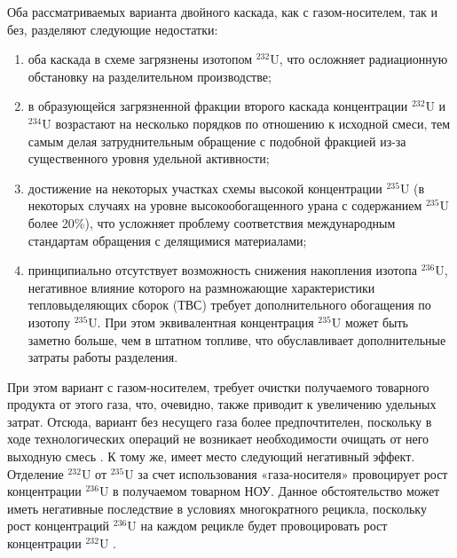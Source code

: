 Оба рассматриваемых варианта двойного каскада, как с газом-носителем, так и без, разделяют следующие недостатки:
\begin{enumerate}
  \item оба каскада в схеме загрязнены изотопом $^{232}$U, что осложняет радиационную обстановку на разделительном производстве;
  \item в образующейся загрязненной фракции второго каскада концентрации $^{232}$U и $^{234}$U возрастают на несколько порядков по отношению к исходной смеси, тем самым делая затруднительным обращение с подобной фракцией из-за существенного уровня удельной активности;
  \item достижение на некоторых участках схемы высокой концентрации $^{235}$U (в некоторых случаях на уровне высокообогащенного урана с содержанием $^{235}$U более 20\%), что усложняет проблему соответствия международным стандартам обращения с делящимися материалами;
  \item принципиально отсутствует возможность снижения накопления изотопа $^{236}$U, негативное влияние которого на размножающие характеристики тепловыделяющих сборок (ТВС) требует дополнительного обогащения по изотопу $^{235}$U. При этом эквивалентная концентрация $^{235}$U может быть заметно больше, чем в штатном топливе, что обуславливает дополнительные затраты работы разделения.
\end{enumerate}

При этом вариант с газом-носителем, требует очистки получаемого товарного продукта от этого газа, что, очевидно, также приводит к увеличению удельных затрат. Отсюда, вариант без несущего газа более предпочтителен, поскольку в ходе технологических операций не возникает необходимости очищать от него выходную смесь \cite{smirnovKaskadnyeShemyZadachah2012}. К тому же, имеет место следующий негативный эффект. Отделение $^{232}$U от $^{235}$U за счет использования «газа-носителя» провоцирует рост концентрации $^{236}$U в получаемом товарном НОУ. Данное обстоятельство может иметь негативные последствие в условиях многократного рецикла, поскольку рост концентраций $^{236}$U на каждом рецикле будет провоцировать рост концентрации $^{232}$U \cite{dudnikovInfluence236UEfficacy2016}.


